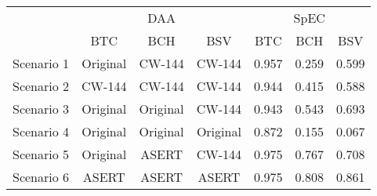 
\begin{tabular}[t]{lcccccc}
\toprule
\multicolumn{1}{c}{ } & \multicolumn{3}{c}{DAA} & \multicolumn{3}{c}{SpEC} \\
\cmidrule(l{3pt}r{3pt}){2-4} \cmidrule(l{3pt}r{3pt}){5-7}
 & BTC & BCH & BSV & BTC & BCH & BSV\\
\midrule
Scenario 1 & Original & CW-144 & CW-144 & 0.957 & 0.259 & 0.599\\
Scenario 2 & CW-144 & CW-144 & CW-144 & 0.944 & 0.415 & 0.588\\
Scenario 3 & Original & Original & CW-144 & 0.943 & 0.543 & 0.693\\
Scenario 4 & Original & Original & Original & 0.872 & 0.155 & 0.067\\
Scenario 5 & Original & ASERT & CW-144 & 0.975 & 0.767 & 0.708\\
Scenario 6 & ASERT & ASERT & ASERT & 0.975 & 0.808 & 0.861\\
\bottomrule
\end{tabular}
